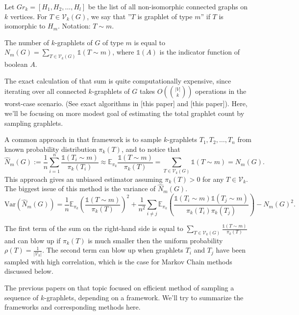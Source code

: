 \documentclass[11pt]{article}
\def\ind{\mathds{1}}
\def\E{\mathbb{E}}
\def\Var{\mathrm{Var}}
\def\cV{\mathcal{V}}
\theoremstyle{remark}
\theoremstyle{definition}
\begin{document}
	Let $Gr_k = [H_1, H_2, \ldots, H_l]$ be the list of all non-isomorphic
	connected graphs on $k$ vertices. For $T\in \cV_k(G)$, we say that ''$T$ is graphlet of
	 type $m$'' if $T$ is isomorphic to $H_m$. Notation: $T \sim m$.
	
	The number of $k$-graphlets of $G$ of type $m$ is equal to 
	$N_m (G) = \sum_{T \in \cV_k(G)} \ind(T \sim m)$, where $\ind(A)$ 
	is the indicator function of boolean $A$.
	
	The exact calculation of that sum is quite computationally expensive, since iterating 
	over all connected $k$-graphlets of $G$ takes $O\left( \binom{|V|}{k} \right)$ 
	operations in the worst-case scenario. (See exact algorithms in [this paper] and [this
	paper]). Here, we'll be focusing on more modest goal of estimating the total
	graphlet count by sampling graphlets.
	
	A common approach in that framework is to sample $k$-graphlets $T_1, T_2, \ldots, 
	T_n$ from known probability distribution $\pi_k(T)$, and to notice that
	\begin{equation*}
		\hat N_m(G) := \frac{1}{n} \sum_{i=1}^n \frac{\ind(T_i\sim m)}{\pi_k(T_i)}  
		\approx \E_{\pi_k} \frac{\ind(T\sim m)}{\pi_k(T)} =
		\sum_{T \in \cV_k(G)} \ind(T\sim m) = N_m(G).
	\end{equation*}
	This approach gives an unbiased estimator assuming $\pi_k(T) >0$ for any 
	$T\in \cV_k$. The biggest issue of this method is the variance of $\hat N_m(G)$.
	\begin{equation}
		\Var(\hat N_m(G)) = \frac{1}{n} \E_{\pi_k}\left( \frac{\ind(T\sim m)}
		{\pi_k(T)} \right)^2 + \frac{1}{n^2} \sum_{i\neq j} \E_{\pi_k}
		\left( \frac{\ind(T_i\sim m) \ind(T_j\sim m)}{\pi_k(T_i)\pi_k(T_j)}\right) 
		- N_m(G)^2.
	\end{equation}
	
	The first term of the sum on the right-hand side is equal to $\sum_{T \in \cV_k(G)} 
	\frac{\ind(T\sim m)}{\pi_k(T)}$ and can blow up if $\pi_k(T)$ is much smaller then the
	uniform probability $\rho(T) = \frac{1}{|\cV_k|}$.
	The second term can blow up when graphlets $T_i$ and $T_j$ have been sampled with
	high correlation, which is the case for Markov Chain methods discussed below.
	
	The previous papers on that topic focused on efficient method of sampling a sequence
	of $k$-graphlets, depending on a framework. We'll try to summarize the frameworks 
	and corresponding methods here.
	
\end{document}

